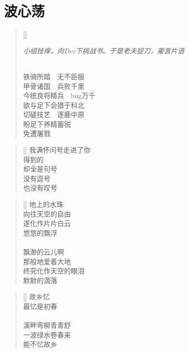 \chapter{波心荡}
\thispagestyle{empty}

\renewcommand{\poemtoc}{section}
\settowidth{\versewidth}{秋高气爽 QA射雕}
\begin{verse}[\versewidth]

\centerline{\emph{\scriptsize{小组技痒，向Dev下挑战书。于是老夫捉刀，豪言片语}}}

\\
铁骑所踏\ \ 无不臣服\\
甲骨诸国\ \ 兵败千里\\
今统良将精兵\ \ bug万千\\
欲与足下会猎于科北\\
切磋技艺\ \ 逐鹿中原\\
盼足下养精蓄锐\\
免遭屠戮 
\end{verse}

\renewcommand{\poemtoc}{section}
\settowidth{\versewidth}{秋高气爽 QA射雕}
\begin{verse}[\versewidth]
我满怀问号走进了你\\
得到的\\
却全是句号\\
没有逗号\\
也没有叹号\\
\end{verse}


\renewcommand{\poemtoc}{section}
\settowidth{\versewidth}{秋高气爽 QA射雕}
\begin{verse}[\versewidth]
地上的水珠\\
向往天空的自由\\
遂化作片片白云\\
悠悠的飘浮\\
~\\
飘渺的云儿啊\\
那般地爱着大地\\
终究化作天空的眼泪\\
默默的滴落
\end{verse}
\newpage

\renewcommand{\poemtoc}{section}
\settowidth{\versewidth}{风仍劲, 雪正紧}
\begin{verse}[\versewidth]
故乡忆\\
最忆是初春\\
~\\
溪畔弯柳青青舒\\
一波绿水卷春来\\
能不忆故乡
\end{verse}


